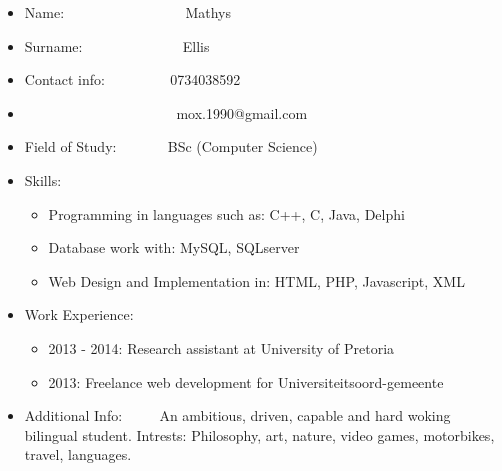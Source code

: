 \documentclass[12pt]{article}
\begin{document}
\begin{itemize}
\item Name: \ ~~~~~~~~~~~~~~ \ Mathys
\item Surname: \ ~~~~~~~~~~~ \ Ellis
\item Contact info: \ ~~~~~~ \ 0734038592
\item \ ~~~~~~~~~~~~~~~~~~~ \ mox.1990@gmail.com
\item Field of Study: \ ~~~~ \ BSc (Computer Science)
\item Skills: \begin{itemize}
\item Programming in languages such as: C++, C, Java, Delphi
\item Database work with: MySQL, SQLserver
\item Web Design and Implementation in: HTML, PHP, Javascript, XML%
\end{itemize}
\item Work Experience: \begin{itemize}
\item 2013 - 2014: Research assistant at University of Pretoria
\item 2013: Freelance web development for Universiteitsoord-gemeente
\end{itemize}
\item Additional Info: \ ~~ \ An ambitious, driven, capable and hard woking bilingual student. Intrests: Philosophy, art, nature, video games, motorbikes, travel, languages.

\end{itemize}
\end{document}
